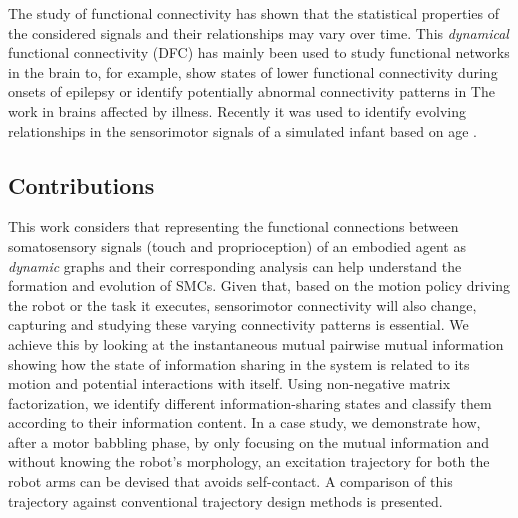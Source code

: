 The study of functional connectivity has shown that the statistical properties of the considered signals and their relationships may vary over time. This \emph{dynamical} functional connectivity (DFC) has mainly been used to study functional networks in the brain to, for example, show states of lower functional connectivity during onsets of epilepsy\cite{Christiaen2020Dynamicfunctionalconnectivity} or identify potentially abnormal connectivity patterns in The work in brains affected by illness\cite{Zhou2020Earlychildhooddevelopmental}. Recently it was used to identify evolving relationships in the sensorimotor signals of a simulated infant based on age \cite{Kanazawa2023Openendedmovements}. %

\subsection{Contributions}
This work considers that representing the functional connections between somatosensory signals (touch and proprioception) of an embodied agent as \emph{dynamic} graphs and their corresponding analysis can help understand the formation and evolution of SMCs. Given that, based on the motion policy driving the robot or the task it executes, sensorimotor connectivity will also change, capturing and studying these varying connectivity patterns is essential. We achieve this by looking at the instantaneous mutual pairwise mutual information showing how the state of information sharing in the system is related to its motion and potential interactions with itself. Using non-negative matrix factorization, we identify different information-sharing states and classify them according to their information content. In a case study, we demonstrate how, after a motor babbling phase, by only focusing on the mutual information and without knowing the robot's morphology, an excitation trajectory for both the robot arms can be devised that avoids self-contact. A comparison of this trajectory against conventional trajectory design methods is presented.

